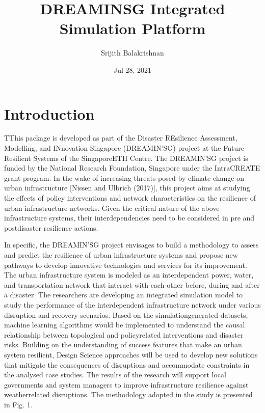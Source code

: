 \documentclass[letterpaper,10pt,english]{sphinxmanual}
\title{DREAMIN\textquotesingle{}SG Integrated Simulation Platform}
\date{Jul 28, 2021}
\author{Srijith Balakrishnan}
\begin{document}
\pagestyle{empty}
\sphinxmaketitle
\pagestyle{plain}
\sphinxtableofcontents
\pagestyle{normal}
\label{\detokenize{index::doc}}



\chapter{Introduction}
\label{\detokenize{intro:introduction}}\label{\detokenize{intro::doc}}
\sphinxAtStartPar
TThis package is developed as part of the Disaster REsilience Assessment,
Modelling, and INno\sphinxhyphen{}vation Singapore (DREAMIN’SG) project at the Future
Resilient Systems of the Singapore\sphinxhyphen{}ETH Centre. The DREAMIN’SG project is
funded by the National Research Foundation, Singapore under the Intra\sphinxhyphen{}CREATE
grant program. In the wake of increasing threats posed by climate change
on urban infrastructure {[}Nissen and Ulbrich (2017){]}, this project aims at
studying the effects of policy interventions and network characteristics on
the resilience of urban infrastructure networks. Given the critical nature of
the above infrastructure systems, their interdependencies need to be
considered in pre\sphinxhyphen{} and post\sphinxhyphen{}disaster resilience actions.

\sphinxAtStartPar
In specific, the DREAMIN’SG project envisages to build a methodology to assess and predict
the resilience of urban infrastructure systems and propose new pathways to
develop innovative technologies and services for its improvement. The urban
infrastructure system is modeled as an interdependent power\sphinxhyphen{}, water\sphinxhyphen{}, and
transportation network that interact with each other before, during and
after a disaster. The researchers are developing an integrated simulation
model to study the performance of the interdependent infrastructure network
under various disruption and recov\sphinxhyphen{}ery scenarios. Based on the
simulation\sphinxhyphen{}generated datasets, machine learning algorithms would be implemented
to understand the causal relationship between topological and policy\sphinxhyphen{}related
interventions and disaster risks. Building on the understanding of success
features that make an urban system resilient, Design Science approaches will
be used to develop new solutions that mitigate the consequences of
disruptions and accommodate constraints in the analysed case studies.
The results of the research will support local governments and system managers
to improve infrastructure resilience against weather\sphinxhyphen{}related disruptions.
The methodology adopted in the study is presented in Fig. 1.
\end{document}
